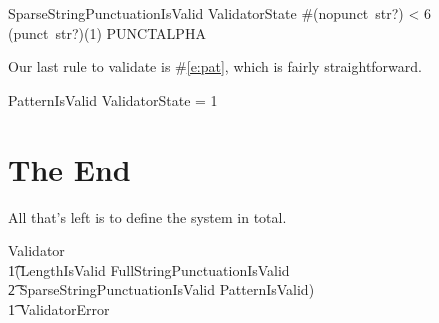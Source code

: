 \documentclass[11pt]{article}
\begin{document}
\begin{schema}{SparseStringPunctuationIsValid}
  ValidatorState
  \where
  \#(nopunct~str?) < 6 \\
  (punct~str?)(1) \in PUNCTALPHA
\end{schema}

Our last rule to validate is \#\ref{e:pat}, which is fairly straightforward.

\begin{schema}{PatternIsValid}
  ValidatorState
   = 1
\end{schema}

\section{The End}

All that's left is to define the system in total.

\begin{zed}
  Validator  \\
  \t1(LengthIsValid \land FullStringPunctuationIsValid \land \\
  \t2 SparseStringPunctuationIsValid \land PatternIsValid) \lor \\
  \t1 ValidatorError
\end{zed}
\end{document}
